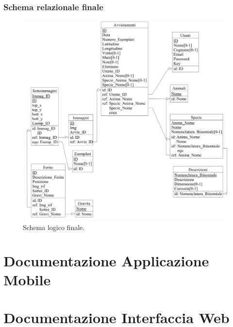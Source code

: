 \documentclass[a4paper,final,12pt]{report}
\begin{document}
\newpage
\subsection{Schema relazionale finale}
\begin{figure}[hbtp]
\centering
\includegraphics[scale=0.22]{img_concettuale/Logico.png}
\caption{Schema logico finale.}
\end{figure}

\chapter{Documentazione Applicazione Mobile}

\chapter{Documentazione Interfaccia Web}
\end{document}
